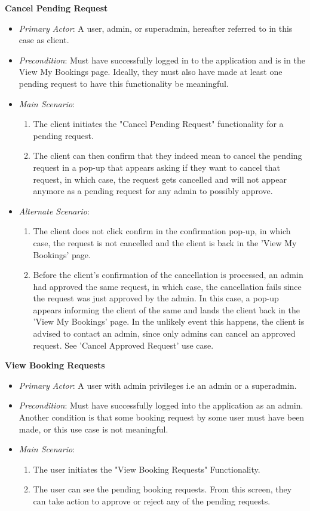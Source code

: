 \documentclass{article}
\begin{document}
\textbf{Cancel Pending Request}
\label{uccancelpendingrequest}
\begin{itemize}
    \item \textit{Primary Actor}: A user, admin, or superadmin, hereafter referred to in this case as client. 
    \item \textit{Precondition}: Must have successfully logged in to the application and is in the View My Bookings page. Ideally, they must also have made at least one pending request to have this functionality be meaningful. 
   \item \textit{Main Scenario}:
   \begin{enumerate}
       \item The client initiates the "Cancel Pending Request" functionality for a pending request.
       \item The client can then confirm that they indeed mean to cancel the pending request in a pop-up that appears asking if they want to cancel that request, in which case, the request gets cancelled and will not appear anymore as a pending request for any admin to possibly approve.
   \end{enumerate}
   \item \textit{Alternate Scenario}:
   \begin{enumerate}
       \item The client does not click confirm in the confirmation pop-up, in which case, the request is not cancelled and the client is back in the 'View My Bookings' page.
       \item Before the client's confirmation of the cancellation is processed, an admin had approved the same request, in which case, the cancellation fails since the request was just approved by the admin. In this case, a pop-up appears informing the client of the same and lands the client back in the 'View My Bookings' page. In the unlikely event this happens, the client is advised to contact an admin, since only admins can cancel an approved request. See 'Cancel Approved Request' use case.
   \end{enumerate}
\end{itemize}

\textbf{View Booking Requests}
\label{ucviewbookingrequests}
\begin{itemize}
    \item \textit{Primary Actor}: A user with admin privileges i.e an admin or a superadmin. 
    \item \textit{Precondition}: Must have successfully logged into the application as an admin. Another condition is that some booking request by some user must have been made, or this use case is not meaningful. 
    \item \textit{Main Scenario}:
    \begin{enumerate}
        \item The user initiates the "View Booking Requests" Functionality.
        \item The user can see the pending booking requests. From this screen, they can take action to approve or reject any of the pending requests. 
    \end{enumerate}
\end{itemize}
\end{document}
